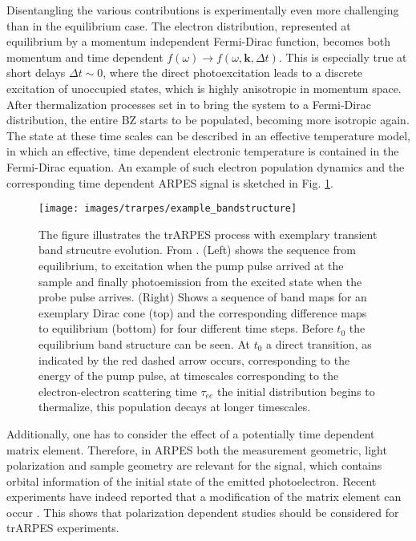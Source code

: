 Disentangling the various contributions is experimentally even more challenging than in the equilibrium case.
The electron distribution, represented at equilibrium by a momentum independent Fermi-Dirac function, becomes both momentum and time dependent $f(\omega) \rightarrow f(\omega, \mathbf{k}, \Delta t)$.
This is especially true at short delays $\Delta t \sim 0$, where the direct photoexcitation leads to a discrete excitation of unoccupied states, which is highly anisotropic in momentum space.
After thermalization processes set in to bring the system to a Fermi-Dirac distribution, the entire BZ starts to be populated, becoming more isotropic again.
The state at these time scales can be described in an effective temperature model, in which an effective, time dependent electronic temperature is contained in the Fermi-Dirac equation.
An example of such electron population dynamics and the corresponding time dependent ARPES signal is sketched in Fig. \ref{fig:example_bandstructure}.

\begin{figure}
	\centering
	\texttt{[image: images/trarpes/example\_bandstructure]}
	\caption{The figure illustrates the trARPES process with exemplary transient band strucutre evolution. From \cite{boschini_time-resolved_2024}. (Left) shows the sequence from equilibrium, to excitation when the pump pulse arrived at the sample and finally photoemission from the excited state when the probe pulse arrives. (Right) Shows a sequence of band maps for an exemplary Dirac cone (top) and the corresponding difference maps to equilibrium (bottom) for four different time steps. Before $t_0$ the equilibrium band structure can be seen. At $t_0$ a direct transition, as indicated by the red dashed arrow occurs, corresponding to the energy of the pump pulse, at timescales corresponding to the electron-electron scattering time $\tau_{ee}$ the initial distribution begins to thermalize, this population decays at longer timescales.}
	\label{fig:example_bandstructure}
\end{figure}


Additionally, one has to consider the effect of a potentially time dependent matrix element.
Therefore, in ARPES both the measurement geometric, light polarization and sample geometry are relevant for the signal, which contains orbital information of the initial state of the emitted photoelectron.
Recent experiments have indeed reported that a modification of the matrix element can occur \cite{boschini_role_2020,freericks_constant_2016}.
This shows that polarization dependent studies should be considered for trARPES experiments.

